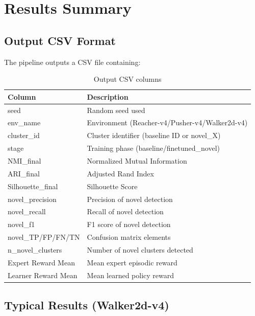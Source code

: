 \documentclass{article}
\begin{document}
\section{Results Summary}

\subsection{Output CSV Format}

The pipeline outputs a CSV file containing:

\begin{table}[h]
\centering
\small
\begin{tabular}{ll}
\toprule
\textbf{Column} & \textbf{Description} \\
\midrule
seed & Random seed used \\
env\_name & Environment (Reacher-v4/Pusher-v4/Walker2d-v4) \\
cluster\_id & Cluster identifier (baseline ID or novel\_X) \\
stage & Training phase (baseline/finetuned\_novel) \\
NMI\_final & Normalized Mutual Information \\
ARI\_final & Adjusted Rand Index \\
Silhouette\_final & Silhouette Score \\
novel\_precision & Precision of novel detection \\
novel\_recall & Recall of novel detection \\
novel\_f1 & F1 score of novel detection \\
novel\_TP/FP/FN/TN & Confusion matrix elements \\
n\_novel\_clusters & Number of novel clusters detected \\
Expert Reward Mean & Mean expert episodic reward \\
Learner Reward Mean & Mean learned policy reward \\
\bottomrule
\end{tabular}
\caption{Output CSV columns}
\end{table}

\subsection{Typical Results (Walker2d-v4)}
\end{document}
